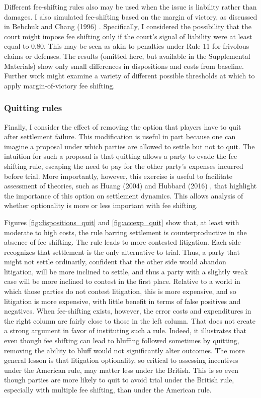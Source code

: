 \documentclass{article}
\begin{document}
Different fee-shifting rules also may be used when the issue is liability rather than damages. I also simulated fee-shifting based on the margin of victory, as discussed in Bebchuk and Chang (1996) \cite{bebchukchang}. Specifically, I considered the possibility that the court might impose fee shifting only if the court's signal of liability were at least equal to 0.80. This may be seen as akin to penalties under Rule 11 for frivolous claims or defenses. The results (omitted here, but available in the Supplemental Materials) show only small differences in dispositions and costs from baseline. Further work might examine a variety of different possible thresholds at which to apply margin-of-victory fee shifting.

\subsubsection{Quitting rules}

Finally, I consider the effect of removing the option that players have to quit after settlement failure. This modification is useful in part because one can imagine a proposal under which parties are allowed to settle but not to quit. The intuition for such a proposal is that quitting allows a party to evade the fee shifting rule, escaping the need to pay for the other party's expenses incurred before trial. More importantly, however, this exercise is useful to facilitate assessment of theories, such as Huang (2004) \cite{huang} and Hubbard (2016) \cite{hubbard}, that highlight the importance of this option on settlement dynamics. This allows analysis of whether optionality is more or less important with fee shifting.

Figures \ref{fig:dispositions_quit} and \ref{fig:accexp_quit} show that, at least with moderate to high costs, the rule barring settlement is counterproductive in the absence of fee shifting. The rule leads to more contested litigation. Each side recognizes that settlement is the only alternative to trial. Thus, a party that might not settle ordinarily, confident that the other side would abandon litigation, will be more inclined to settle, and thus a party with a slightly weak case will be more inclined to contest in the first place. Relative to a world in which those parties do not contest litigation, this is more expensive, and so litigation is more expensive, with little benefit in terms of false positives and negatives. When fee-shifting exists, however, the error costs and expenditures in the right column are fairly close to those in the left column. That does not create a strong argument in favor of instituting such a rule. Indeed, it illustrates that even though fee shifting can lead to bluffing followed sometimes by quitting, removing the ability to bluff would not significantly alter outcomes. The more general lesson is that litigation optionality, so critical to assessing incentives under the American rule, may matter less under the British. This is so even though parties are more likely to quit to avoid trial under the British rule, especially with multiple fee shifting, than under the American rule. 
\end{document}
